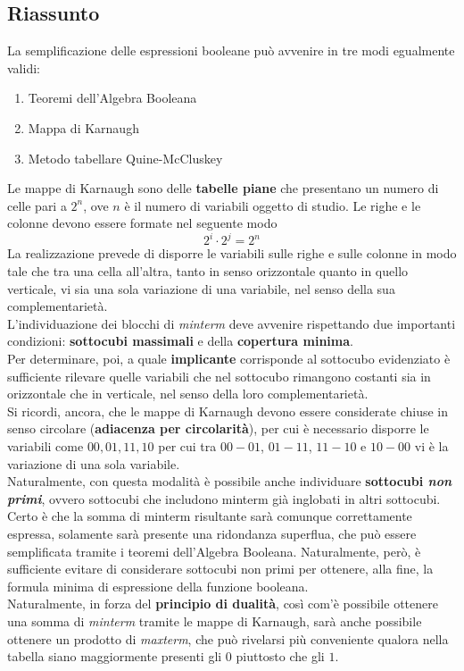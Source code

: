 \documentclass[a4paper]{extarticle}
\begin{document}
\subsection{Riassunto}
La semplificazione delle espressioni booleane può avvenire in tre modi egualmente validi:
\begin{enumerate}
    \item Teoremi dell'Algebra Booleana
    \item Mappa di Karnaugh
    \item Metodo tabellare Quine-McCluskey
\end{enumerate}
Le mappe di Karnaugh sono delle \textbf{tabelle piane} che presentano un numero di celle pari a \(2^n\), ove \(n\) è il numero di variabili oggetto di studio. Le righe e le colonne devono essere formate nel seguente modo
\[2^i \cdot 2^j = 2^n\]
La realizzazione prevede di disporre le variabili sulle righe e sulle colonne in modo tale che tra una cella all'altra, tanto in senso orizzontale quanto in quello verticale, vi sia una sola variazione di una variabile, nel senso della sua complementarietà.\\
L'individuazione dei blocchi di \textit{minterm} deve avvenire rispettando due importanti condizioni: \textbf{sottocubi massimali} e della \textbf{copertura minima}.\\
Per determinare, poi, a quale \textbf{implicante} corrisponde al sottocubo evidenziato è sufficiente rilevare quelle variabili che nel sottocubo rimangono costanti sia in orizzontale che in verticale, nel senso della loro complementarietà.\\
Si ricordi, ancora, che le mappe di Karnaugh devono essere considerate chiuse in senso circolare (\textbf{adiacenza per circolarità}), per cui è necessario disporre le variabili come \(00, 01, 11, 10\) per cui tra \(00 - 01\), \(01 - 11\), \(11 - 10\) e \(10 - 00\) vi è la variazione di una sola variabile.\\
Naturalmente, con questa modalità è possibile anche individuare \textbf{sottocubi \textit{non primi}}, ovvero sottocubi che includono minterm già inglobati in altri sottocubi. Certo è che la somma di minterm risultante sarà comunque correttamente espressa, solamente sarà presente una ridondanza superflua, che può essere semplificata tramite i teoremi dell'Algebra Booleana. Naturalmente, però, è sufficiente evitare di considerare sottocubi non primi per ottenere, alla fine, la formula minima di espressione della funzione booleana.\\
Naturalmente, in forza del \textbf{principio di dualità}, così com'è possibile ottenere una somma di \textit{minterm} tramite le mappe di Karnaugh, sarà anche possibile ottenere un prodotto di \textit{maxterm}, che può rivelarsi più conveniente qualora nella tabella siano maggiormente presenti gli \(0\) piuttosto che gli \(1\).\\
\end{document}
